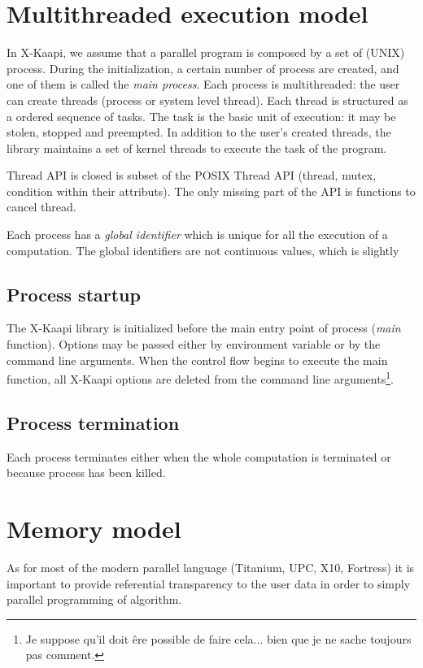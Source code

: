 \documentclass{report}
\newcommand{\kaapi}{\textsc{X}-Kaapi\xspace}
\begin{document}
\section{Multithreaded execution model}
In \kaapi, we assume that a parallel program is composed by a set of (UNIX) process. During the initialization, a certain number of process are created, and one of them is called the \textit{main process}. Each process is multithreaded: the user can create threads (process or system level thread). Each thread is structured as a ordered sequence of tasks. The task is the basic unit of execution: it may be stolen, stopped and preempted. In addition to the user's created threads, the  library maintains a set of kernel threads to execute the task of the program.

Thread API is closed is subset of the POSIX Thread API (thread, mutex, condition within their attributs). The only missing part of the API is functions to cancel thread.

Each process has a \textit{global identifier} which is unique for all the execution of a computation. The global identifiers are not continuous values, which is slightly 

\subsection{Process startup}

The \kaapi library is initialized before the main entry point of process (\textit{main} function). Options may be passed either by environment variable or by the command line arguments. When the control flow begins to execute the main function, all \kaapi options are deleted from the command line arguments\footnote{Je suppose qu'il doit êre possible de faire cela... bien que je ne sache toujours pas comment.}.

\subsection{Process termination}
Each process terminates either when the whole computation is terminated or because process has been killed.

\section{Memory model}
As for most of the modern parallel language (Titanium, UPC, X10, Fortress) it is important to provide referential transparency to the user data in order to simply parallel programming of algorithm. 
\end{document}
